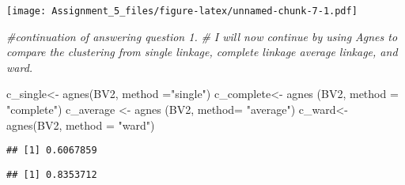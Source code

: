 \documentclass[
]{article}
\newenvironment{Shaded}{\begin{snugshade}}{\end{snugshade}}
\newcommand{\AttributeTok}[1]{\textcolor[rgb]{0.77,0.63,0.00}{#1}}
\newcommand{\CommentTok}[1]{\textcolor[rgb]{0.56,0.35,0.01}{\textit{#1}}}
\newcommand{\FunctionTok}[1]{\textcolor[rgb]{0.00,0.00,0.00}{#1}}
\newcommand{\NormalTok}[1]{#1}
\newcommand{\OtherTok}[1]{\textcolor[rgb]{0.56,0.35,0.01}{#1}}
\newcommand{\SpecialCharTok}[1]{\textcolor[rgb]{0.00,0.00,0.00}{#1}}
\newcommand{\StringTok}[1]{\textcolor[rgb]{0.31,0.60,0.02}{#1}}
\begin{document}
\texttt{[image: Assignment\_5\_files/figure-latex/unnamed-chunk-7-1.pdf]}

\begin{Shaded}
\begin{Highlighting}[]
\CommentTok{\#continuation of answering question 1. }
\CommentTok{\# I will now continue by using Agnes to compare the clustering from single linkage, complete linkage average linkage, and ward. }

\NormalTok{c\_single}\OtherTok{\textless{}{-}} \FunctionTok{agnes}\NormalTok{(BV2, }\AttributeTok{method =}\StringTok{"single"}\NormalTok{)}
\NormalTok{c\_complete}\OtherTok{\textless{}{-}} \FunctionTok{agnes}\NormalTok{ (BV2, }\AttributeTok{method =} \StringTok{"complete"}\NormalTok{)}
\NormalTok{c\_average }\OtherTok{\textless{}{-}} \FunctionTok{agnes}\NormalTok{ (BV2, }\AttributeTok{method=} \StringTok{"average"}\NormalTok{)}
\NormalTok{c\_ward}\OtherTok{\textless{}{-}} \FunctionTok{agnes}\NormalTok{(BV2, }\AttributeTok{method =} \StringTok{"ward"}\NormalTok{)}
\end{Highlighting}
\end{Shaded}

\begin{Shaded}
\end{Shaded}

\begin{verbatim}
## [1] 0.6067859
\end{verbatim}

\begin{Shaded}
\end{Shaded}

\begin{verbatim}
## [1] 0.8353712
\end{verbatim}

\begin{Shaded}
\end{Shaded}
\end{document}
